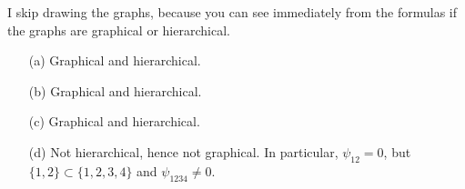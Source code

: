 I skip drawing the graphs, because you can see immediately from the formulas if the graphs are graphical or hierarchical.

\begin{itemize}
    \item[(a)] Graphical and hierarchical.
    \item[(b)] Graphical and hierarchical.
    \item[(c)] Graphical and hierarchical.
    \item[(d)] Not hierarchical, hence not graphical.
        In particular, $\psi_{12} = 0$, but $\{1, 2\} \subset \{1, 2, 3, 4\}$ and $\psi_{1234} \neq 0$.
\end{itemize}
